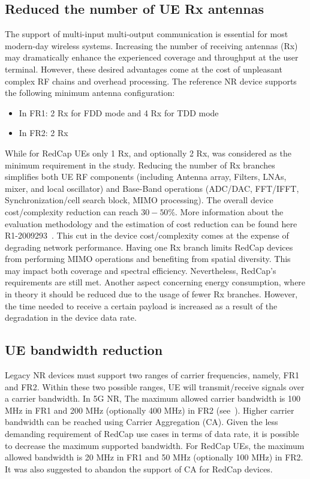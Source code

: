 \documentclass[]{IEEEtran}
\begin{document}
\subsection{Reduced the number of UE Rx antennas}
\label{sec:4-1}
The support of multi-input multi-output communication is essential for most modern-day wireless systems.
Increasing the number of receiving antennas (Rx) may dramatically enhance the experienced coverage and throughput at the user terminal.
However, these desired advantages come at the cost of unpleasant complex RF chains and overhead processing.
The reference NR device supports the following minimum antenna configuration:
\begin{itemize}
    \item In FR1: 2 Rx for FDD mode and 4 Rx for TDD mode
    \item In FR2: 2 Rx
\end{itemize}
While for RedCap UEs only 1 Rx, and optionally 2 Rx, was considered as the minimum requirement in the study.
Reducing the number of Rx branches simplifies both UE RF components (including Antenna array, Filters, LNAs, mixer, and local oscillator) and Base-Band operations (ADC/DAC, FFT/IFFT, Synchronization/cell search block, MIMO processing).
The overall device cost/complexity reduction can reach $30-50\%$.
More information about the evaluation methodology and the estimation of cost reduction can be found here R1-2009293~\cite{3gpp_fl_2022_R1-2009293}.
This cut in the device cost/complexity comes at the expense of degrading network performance.
Having one Rx branch limits RedCap devices from performing MIMO operations and benefiting from spatial diversity.
This may impact both coverage and spectral efficiency. Nevertheless, RedCap's requirements are still met.
Another aspect concerning energy consumption, where in theory it should be reduced due to the usage of fewer Rx branches.
However, the time needed to receive a certain payload is increased as a result of the degradation in the device data rate.

\subsection{UE bandwidth reduction}
\label{sec:4-2}

Legacy NR devices must support two ranges of carrier frequencies, namely, FR1 and FR2.
Within these two possible ranges, UE will transmit/receive signals over a carrier bandwidth.
In 5G NR, The maximum allowed carrier bandwidth is 100 MHz in FR1 and 200 MHz (optionally 400 MHz) in FR2 (see~\cite{3gpp_nr_nodate-2_38.101-1,3gpp_nr_2022-7_38.101-2}).
Higher carrier bandwidth can be reached using Carrier Aggregation (CA).
Given the less demanding requirement of RedCap use cases in terms of data rate, it is possible to decrease the maximum supported bandwidth.
For RedCap UEs, the maximum allowed bandwidth is 20 MHz in FR1 and 50 MHz (optionally 100 MHz) in FR2.
It was also suggested to abandon the support of CA for RedCap devices.
\end{document}
